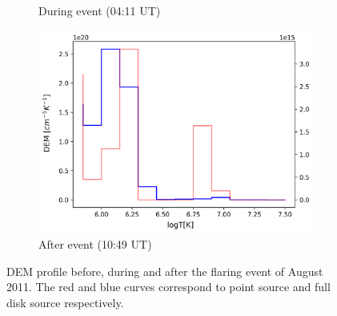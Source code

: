 \begin{figure}[h!]
\begin{subfigure}[b]{0.3\textwidth}
        \caption{During event (04:11 UT)}
    \end{subfigure}
    \hfill
    \begin{subfigure}[b]{0.3\textwidth}
        \centering
        \includegraphics[width=\textwidth]{images/dem_profile_after_event_2011_aug_04.png}
        \caption{After event (10:49 UT)}
    \end{subfigure}

    \caption[DEM profile for  August 2011 event]{DEM profile before, during and after the flaring event of  August 2011. The red and blue curves correspond to point source and full disk source respectively.}
    \label{fig:dem_pro_aug_04_2011}
\end{figure}


